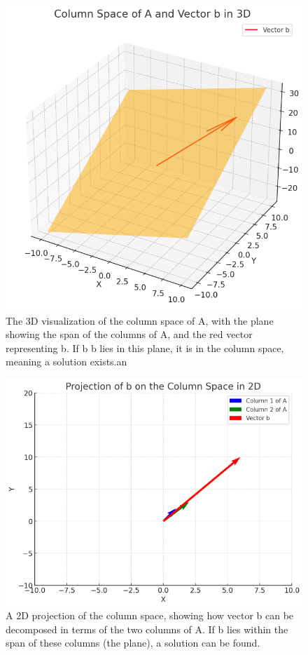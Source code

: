 \documentclass[../Main.tex]{subfiles}
\begin{document}
\begin{figure}[H]
    \centering
    \includegraphics[width=0.5\linewidth]{Images/col-space-1.png}
    \caption{The 3D visualization of the column space of A,
    with the plane showing the span of the columns of A,
    and the red vector representing b. 
    If b b lies in this plane, it is in the column space, meaning a solution exists.an}
\end{figure}
\begin{figure}[H]
    \centering
    \includegraphics[width=0.5\linewidth]{Images/col-space-2.png}
    \caption{A 2D projection of the column space, showing how vector 
    b can be decomposed in terms of the two columns of A.
    If b lies within the span of these columns (the plane), a solution can be found.}
\end{figure}

\end{document}

